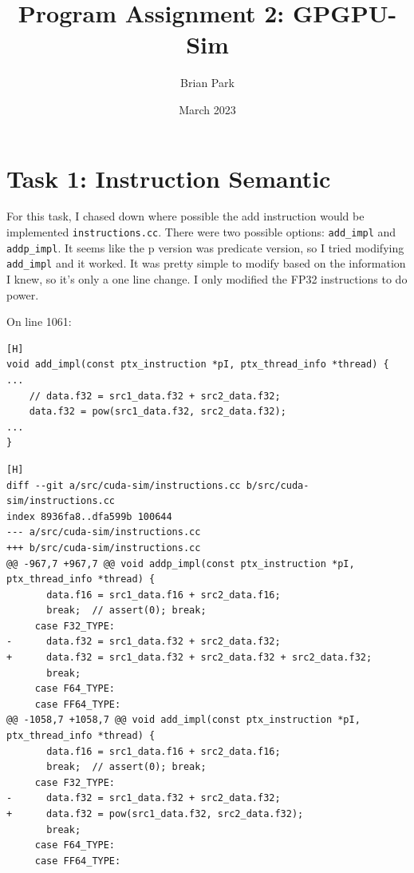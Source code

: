\documentclass{article}
\title{Program Assignment 2: GPGPU-Sim}
\author{Brian Park}
\affil{North Carolina State University, Computer Engineering 786}
\date{March 2023}
\begin{document}
\maketitle

\section{Task 1: Instruction Semantic}
For this task, I chased down where possible the add instruction would be implemented \verb|instructions.cc|. There were two possible options: \verb|add_impl| and \verb|addp_impl|. It seems like the p version was predicate version, so I tried modifying \verb|add_impl| and it worked. It was pretty simple to modify based on the information I knew, so it's only a one line change. I only modified the FP32 instructions to do power. 

On line 1061:

\begin{verbatim}[H]
void add_impl(const ptx_instruction *pI, ptx_thread_info *thread) {
...
    // data.f32 = src1_data.f32 + src2_data.f32;
    data.f32 = pow(src1_data.f32, src2_data.f32);
...
}
\end{verbatim}

\begin{verbatim}[H]
diff --git a/src/cuda-sim/instructions.cc b/src/cuda-sim/instructions.cc
index 8936fa8..dfa599b 100644
--- a/src/cuda-sim/instructions.cc
+++ b/src/cuda-sim/instructions.cc
@@ -967,7 +967,7 @@ void addp_impl(const ptx_instruction *pI, ptx_thread_info *thread) {
       data.f16 = src1_data.f16 + src2_data.f16;
       break;  // assert(0); break;
     case F32_TYPE:
-      data.f32 = src1_data.f32 + src2_data.f32;
+      data.f32 = src1_data.f32 + src2_data.f32 + src2_data.f32;
       break;
     case F64_TYPE:
     case FF64_TYPE:
@@ -1058,7 +1058,7 @@ void add_impl(const ptx_instruction *pI, ptx_thread_info *thread) {
       data.f16 = src1_data.f16 + src2_data.f16;
       break;  // assert(0); break;
     case F32_TYPE:
-      data.f32 = src1_data.f32 + src2_data.f32;
+      data.f32 = pow(src1_data.f32, src2_data.f32);
       break;
     case F64_TYPE:
     case FF64_TYPE:
\end{verbatim}
\end{document}
